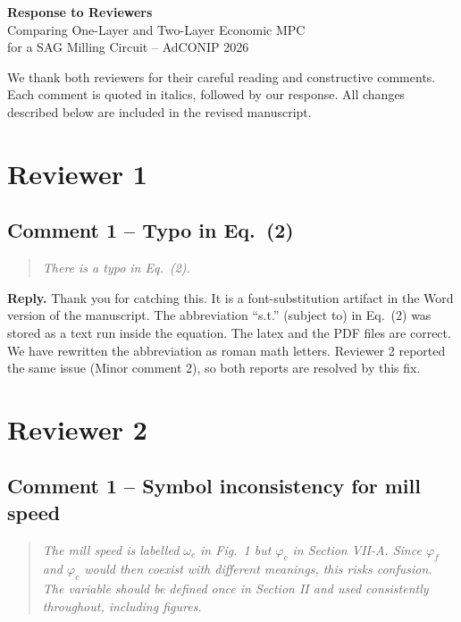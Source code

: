 \documentclass[11pt]{article}
\newenvironment{reviewquote}%
  {\begin{quote}\itshape}%
  {\end{quote}}
\begin{document}
\begin{center}
{\Large\bfseries Response to Reviewers}\\[4pt]
{\large Comparing One-Layer and Two-Layer Economic MPC\\
for a SAG Milling Circuit -- AdCONIP 2026}
\end{center}

We thank both reviewers for their careful reading and constructive
comments. Each comment is quoted in italics, followed by our response.
All changes described below are included in the revised manuscript.

\section*{Reviewer 1}

\subsection*{Comment 1 -- Typo in Eq.~(2)}

\begin{reviewquote}
There is a typo in Eq.~(2).
\end{reviewquote}

\textbf{Reply.} Thank you for catching this. It is a font-substitution
artifact in the Word version of the manuscript. The abbreviation
``s.t.'' (subject to) in Eq.~(2) was stored as a text run inside the
equation. The latex and the PDF files are correct. We have rewritten the
abbreviation as roman math letters. Reviewer 2 reported the same issue
(Minor comment 2), so both reports are resolved by this fix.

\section*{Reviewer 2}

\subsection*{Comment 1 -- Symbol inconsistency for mill speed}

\begin{reviewquote}
The mill speed is labelled $\omega_c$ in Fig.~1 but $\varphi_c$ in
Section VII-A. Since $\varphi_f$ and $\varphi_c$ would then coexist
with different meanings, this risks confusion. The variable should be
defined once in Section II and used consistently throughout, including
figures.
\end{reviewquote}
\end{document}
